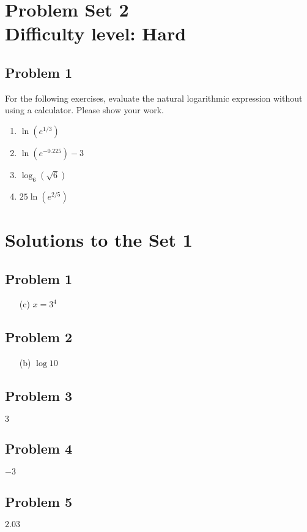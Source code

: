 \documentclass[12pt]{article}
\begin{document}
\section*{Problem Set 2\\Difficulty level: Hard}
\subsection*{Problem 1}
For the following exercises, evaluate the natural logarithmic expression without using a calculator. Please show your work.
\begin{enumerate}[label=(\alph*)]
    \item \(\ln(e^{1/3})\)
    \item \(\ln(e^{-0.225})-3\)
    \item \(\log_6(\sqrt{6})\)
    \item \(25\ln(e^{2/5})\)
\end{enumerate}


\newpage
\section*{Solutions to the Set 1}

\subsection*{Problem 1}
\begin{enumerate}
    \item[(c)] \(x=3^4\) 
\end{enumerate}

\subsection*{Problem 2}
\begin{enumerate}
    \item[(b)] \( \log 10 \)
\end{enumerate}


\subsection*{Problem 3}
\(3 \)

\subsection*{Problem 4}
\( -3 \)

\subsection*{Problem 5}
\( 2.03 \)
\end{document}
